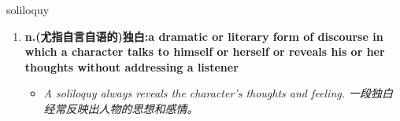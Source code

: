 
\begin{frame}
{\huge soliloquy}
\begin{center}
\begin{enumerate}\Large
  \item \textbf{n.(尤指自言自语的)独白:a dramatic or literary form of discourse in which a character talks to himself or herself or reveals his or her thoughts without addressing a listener}
  \begin{itemize}
    \item \em{\Large{A soliloquy always reveals the character’s thoughts and feeling. 一段独白经常反映出人物的思想和感情。}}
  \end{itemize}
\end{enumerate}
\end{center}
\end{frame}
